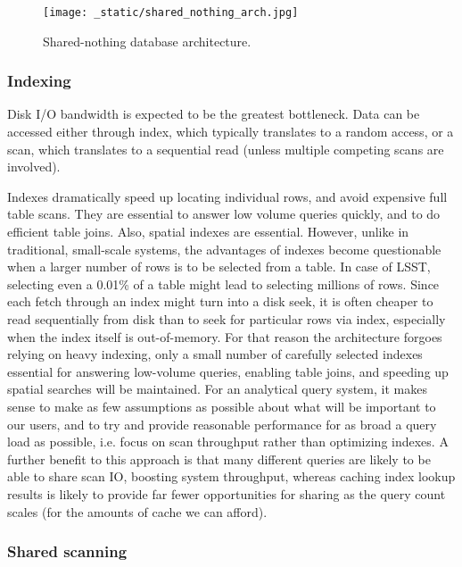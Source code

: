 \documentclass[DM,lsstdraft,toc]{lsstdoc}
\begin{document}
\begin{figure}[H]
\centering
\texttt{[image: \_static/shared\_nothing\_arch.jpg]}
\caption{Shared-nothing database architecture.}
\end{figure}

\subsubsection{Indexing}\label{indexing}

Disk I/O bandwidth is expected to be the greatest bottleneck. Data can
be accessed either through index, which typically translates to a random
access, or a scan, which translates to a sequential read (unless
multiple competing scans are involved).

Indexes dramatically speed up locating individual rows, and avoid
expensive full table scans. They are essential to answer low volume
queries quickly, and to do efficient table joins. Also, spatial indexes
are essential. However, unlike in traditional, small-scale systems, the
advantages of indexes become questionable when a larger number of rows
is to be selected from a table. In case of LSST, selecting even a 0.01\%
of a table might lead to selecting millions of rows. Since each fetch
through an index might turn into a disk seek, it is often cheaper to
read sequentially from disk than to seek for particular rows via index,
especially when the index itself is out-of-memory. For that reason the
architecture forgoes relying on heavy indexing, only a small number of
carefully selected indexes essential for answering low-volume queries,
enabling table joins, and speeding up spatial searches will be
maintained. For an analytical query system, it makes sense to make as
few assumptions as possible about what will be important to our users,
and to try and provide reasonable performance for as broad a query load
as possible, i.e. focus on scan throughput rather than optimizing
indexes. A further benefit to this approach is that many different
queries are likely to be able to share scan IO, boosting system
throughput, whereas caching index lookup results is likely to provide
far fewer opportunities for sharing as the query count scales (for the
amounts of cache we can afford).

\subsubsection{Shared scanning}\label{shared-scanning}
\end{document}
